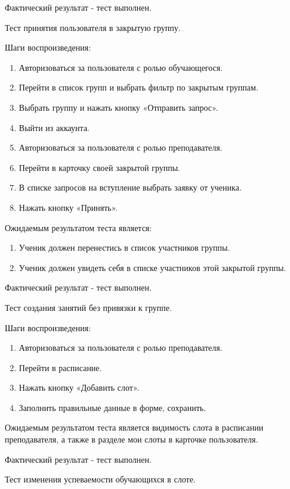 \documentclass[a4paper,14pt,oneside]{extreport}
\begin{document}
Фактический результат - тест выполнен.

Тест принятия пользователя в закрытую группу.

Шаги воспроизведения:

\begin{enumerate}
    \item Авторизоваться за пользователя с ролью обучающегося.
    \item Перейти в список групп и выбрать фильтр по закрытым группам.
    \item Выбрать группу и нажать кнопку «Отправить запрос».
    \item Выйти из аккаунта.
    \item Авторизоваться за пользователя с ролью преподавателя.
    \item Перейти в карточку своей закрытой группы.
    \item В списке запросов на вступление выбрать заявку от ученика.
    \item Нажать кнопку «Принять».
\end{enumerate}

Ожидаемым результатом теста является:

\begin{enumerate}
    \item Ученик должен перенестись в список участников группы.
    \item Ученик должен увидеть себя в списке участников этой закрытой группы.
\end{enumerate}

Фактический результат - тест выполнен.

Тест создания занятий без привязки к группе.

Шаги воспроизведения:
\begin{enumerate}
    \item Авторизоваться за пользователя с ролью преподавателя.
    \item Перейти в расписание.
    \item Нажать кнопку «Добавить слот».
    \item Заполнить правильные данные в форме, сохранить.
\end{enumerate}

Ожидаемым результатом теста является видимость слота в расписании преподавателя, а также в разделе мои слоты в карточке пользователя.

Фактический результат - тест выполнен.

Тест изменения успеваемости обучающихся в слоте.
\end{document}

